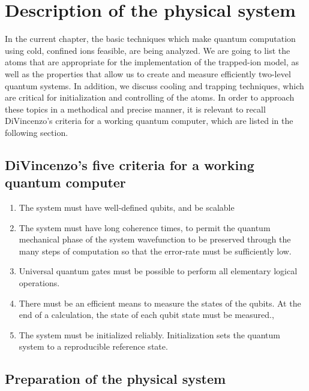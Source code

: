 \documentclass[../main.tex]{subfiles}
\begin{document}
\chapter{Description of the physical system}

\tab In the current chapter, the basic techniques which make quantum computation using cold, confined ions feasible, are being analyzed. We are going to list the atoms that are appropriate for the implementation of the trapped-ion model, as well as the properties that allow us to create and measure efficiently two-level quantum systems. In addition, we discuss cooling and trapping techniques, which are critical for initialization and controlling of the atoms. In order to approach these topics in a methodical and precise manner, it is relevant to recall DiVincenzo's criteria\cite{DiVincenzo-criteria} for a working quantum computer, which are listed in the following section.

\section{DiVincenzo's five criteria for a working quantum computer}

\begin{enumerate}
    \item The system must have well-defined qubits, and be scalable
    \item The system must have long coherence times, to permit the quantum mechanical phase of the system wavefunction to be preserved through the many steps of computation so that the error-rate must be sufficiently low.
    \item Universal quantum gates must be possible to perform all elementary logical operations.
    \item There must be an efficient means to measure the states of the qubits. At the end of a calculation, the state of each qubit state must be measured.,
    \item The system must be initialized reliably. Initialization sets the quantum system to a reproducible reference state. 
\end{enumerate}

\section{Preparation of the physical system}
\end{document}

